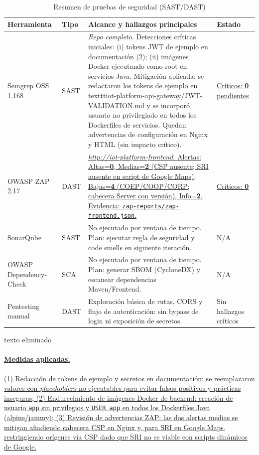 \documentclass[12pt,a4paper,oneside]{report}
\providecommand{\ul}[1]{\uline{#1}}
\begin{document}
\begin{table}[H]
\caption{Resumen de pruebas de seguridad (SAST/DAST)}\label{tab:seguridad}
\centering
\begin{tabularx}{\textwidth}{l l X l}
\toprule
\textbf{Herramienta} & \textbf{Tipo} & \textbf{Alcance y hallazgos principales} & \textbf{Estado} \\
\midrule
Semgrep OSS 1.168 & SAST & \ul{\emph{Repo completo}. Detecciones críticas iniciales: (i) tokens JWT de ejemplo en documentación (2); (ii) imágenes Docker ejecutando como root en servicios Java. Mitigación aplicada: se redactaron los tokens de ejemplo en \\texttt{iot-platform-api-gateway/JWT-VALIDATION.md} y se incorporó usuario no privilegiado en todos los Dockerfiles de servicios. Quedan advertencias de configuración en Nginx y HTML (sin impacto crítico).} & \ul{Críticos: \textbf{0} pendientes} \\
OWASP ZAP 2.17 & DAST & \ul{\emph{http://iot-platform-frontend}. Alertas: Altas=\textbf{0}, Medias=\textbf{2} (CSP ausente; SRI ausente en script de Google Maps), Bajas=\textbf{4} (COEP/COOP/CORP; cabecera Server con versión), Info=\textbf{2}. Evidencia: \texttt{zap-reports/zap-frontend.json}.} & \ul{Críticos: \textbf{0}} \\
SonarQube & SAST & No ejecutado por ventana de tiempo. Plan: ejecutar regla de seguridad y code smells en siguiente iteración. & N/A \\
OWASP Dependency-Check & SCA & No ejecutado por ventana de tiempo. Plan: generar SBOM (CycloneDX) y escanear dependencias Maven/Frontend. & N/A \\
Pentesting manual & DAST & Exploración básica de rutas, CORS y flujo de autenticación: sin bypass de login ni exposición de secretos. & Sin hallazgos críticos \\
\bottomrule
\end{tabularx}
\end{table}

{\color{red} texto eliminado}

\paragraph{\ul{Medidas aplicadas.}} \ul{(1) Redacción de tokens de ejemplo y secretos en documentación: se reemplazaron valores con \emph{placeholders} no ejecutables para evitar falsos positivos y prácticas inseguras; (2) Endurecimiento de imágenes Docker de backend: creación de usuario \texttt{app} sin privilegios y \texttt{USER app} en todos los Dockerfiles Java (alpine/jammy); (3) Revisión de advertencias ZAP: las dos alertas medias se mitigan añadiendo cabecera CSP en Nginx y, para SRI en Google Maps, restringiendo orígenes vía CSP dado que SRI no es viable con scripts dinámicos de Google.}
\end{document}
